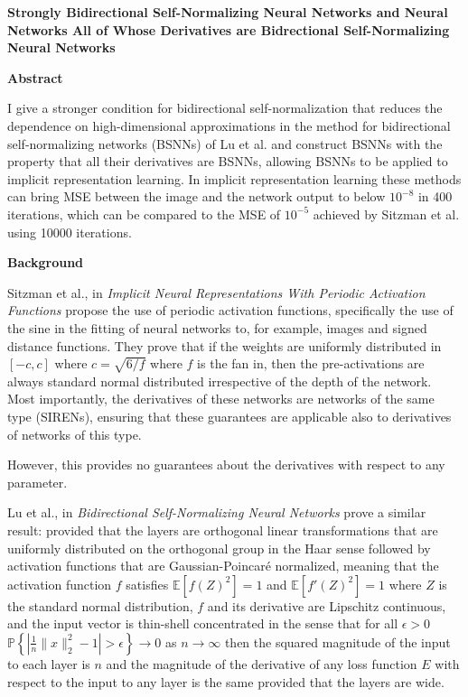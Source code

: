 \documentclass{letter}
\begin{document}
\newtheorem{theorem}{Theorem}
\newtheorem{definition}{Definition}
\begin{center}
\LARGE \bf Strongly Bidirectional Self-Normalizing Neural Networks and Neural Networks All of Whose Derivatives are Bidrectional Self-Normalizing Neural Networks
\end{center}

\begin{center}
{\bf Abstract}

I give a stronger condition for bidirectional self-normalization that reduces the dependence on high-dimensional approximations in the method for bidirectional self-normalizing networks (BSNNs) of Lu et al. and construct BSNNs with the property that all their derivatives are BSNNs, allowing BSNNs to be applied to implicit representation learning. In implicit representation learning these methods can bring MSE between the image and the network output to below $10^{-8}$ in 400 iterations, which can be compared to the MSE of $10^{-5}$ achieved by Sitzman et al. using 10000 iterations.
\end{center}

\begin{center}
{\bf Background}
\end{center}

Sitzman et al., in {\it Implicit Neural Representations With Periodic Activation Functions} propose the use of periodic activation functions, specifically the use of the sine in the fitting of neural networks to, for example, images and signed distance functions. They prove that if the weights are uniformly distributed in $[-c,c]$ where $c=\sqrt{6/f}$ where $f$ is the fan in, then the pre-activations are always standard normal distributed irrespective of the depth of the network. Most importantly, the derivatives of these networks are networks of the same type (SIRENs), ensuring that these guarantees are applicable also to derivatives of networks of this type.

However, this provides no guarantees about the derivatives with respect to any parameter.

Lu et al., in {\it Bidirectional Self-Normalizing Neural Networks} prove a similar result: provided that the layers are orthogonal linear transformations that are uniformly distributed on the orthogonal group in the Haar sense followed by activation functions that are Gaussian-Poincaré normalized, meaning that the activation function $f$ satisfies $\mathbb{E}[f(Z)^2]=1$ and $\mathbb{E}[f'(Z)^2]=1$ where $Z$ is the standard normal distribution, $f$ and its derivative are Lipschitz continuous, and the input vector is thin-shell concentrated in the sense that for all $\epsilon>0$ $\mathbb{P}\left\{|\frac{1}{n}\|x\|_2^2-1|>\epsilon\right\}\rightarrow 0$ as $n\rightarrow \infty$ then the squared magnitude of the input to each layer is $n$ and the magnitude of the derivative of any loss function $E$ with respect to the input to any layer is the same provided that the layers are wide.
\end{document}
